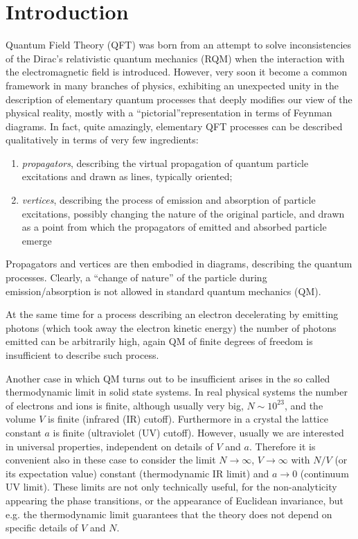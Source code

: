 \documentclass[../main/main.tex]{subfiles}
\begin{document}

\chapter{Introduction} 

Quantum Field Theory (QFT) was born from an attempt to solve inconsistencies of the Dirac's relativistic quantum mechanics (RQM) when the interaction with the electromagnetic field is introduced. However, very soon it become a common framework in many branches of physics, exhibiting an unexpected unity in the description of elementary quantum processes that deeply modifies our view of the physical reality, mostly with a ``pictorial''representation in terms of Feynman diagrams. In fact, quite amazingly, elementary QFT processes can be described qualitatively in terms of  very few ingredients:
\begin{enumerate}[label=\textbullet]
	\item \emph{propagators}, describing the virtual propagation of quantum particle excitations and drawn as lines, typically oriented;
	\item \emph{vertices}, describing the process of emission and absorption of particle excitations, possibly changing the nature of the original particle, and drawn as a point from which the propagators of emitted and absorbed particle emerge
\end{enumerate}
Propagators and vertices are then embodied in diagrams, describing the quantum processes. Clearly, a ``change of nature'' of the particle during emission/absorption is not allowed in standard quantum mechanics (QM). 

At the same time for a process describing an electron decelerating by emitting photons (which took away the electron kinetic energy) the number of photons emitted can be arbitrarily high, again QM of finite degrees of freedom is insufficient to describe such process. 

Another case in which QM turns out to be insufficient arises in the so called thermodynamic limit in solid state systems. In real physical systems the number of electrons and ions is finite, although usually very big, $N\sim10^{23}$, and the volume $V$ is finite (infrared (IR) cutoff). Furthermore in a crystal the lattice constant $a$ is finite (ultraviolet (UV) cutoff). However, usually we are interested in universal properties, independent on details of $V$ and $a$. Therefore it is convenient also in these case to consider the limit $N\to\infty$, $V\to\infty$ with $N/V$ (or its expectation value) constant (thermodynamic IR limit) and $a\to0$ (continuum UV limit). These limits are not only technically useful, for the non-analyticity appearing the phase transitions, or the appearance of Euclidean invariance, but e.g. the thermodynamic limit guarantees that the theory does not depend on specific details of $V$ and $N$. 
\end{document}
